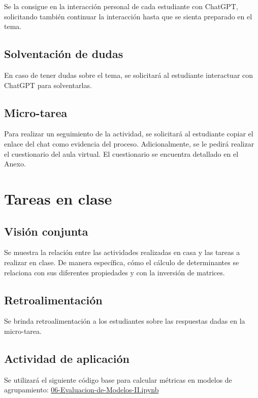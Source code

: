 \documentclass[a4,11pt]{aleph-notas}
\begin{document}
Se la consigue en la interacción personal de cada estudiante con ChatGPT, solicitando también continuar la interacción hasta que se sienta preparado en el tema.

\subsection{Solventación de dudas}

En caso de tener dudas sobre el tema, se solicitará al estudiante interactuar con ChatGPT para solventarlas.

\subsection{Micro-tarea}

Para realizar un seguimiento de la actividad, se solicitará al estudiante copiar el enlace del chat como evidencia del proceso. Adicionalmente, se le pedirá realizar el cuestionario del aula virtual. El cuestionario se encuentra detallado en el Anexo.

\section{Tareas en clase}

\subsection{Visión conjunta}

Se muestra la relación entre las actividades realizadas en casa y las tareas a realizar en clase. De manera específica, cómo el cálculo de determinantes se relaciona con sus diferentes propiedades y con la inversión de matrices.

\subsection{Retroalimentación}

Se brinda retroalimentación a los estudiantes sobre las respuestas dadas en la micro-tarea.

\subsection{Actividad de aplicación}

Se utilizará el siguiente código base para calcular métricas en modelos de agrupamiento: \href{https://colab.research.google.com/github/andres-merino/AprendizajeAutomaticoInicial-05-N0105/blob/main/2-Notebooks/06-Evaluacion-de-Modelos-II.ipynb}{06-Evaluacion-de-Modelos-II.ipynb}
\end{document}
